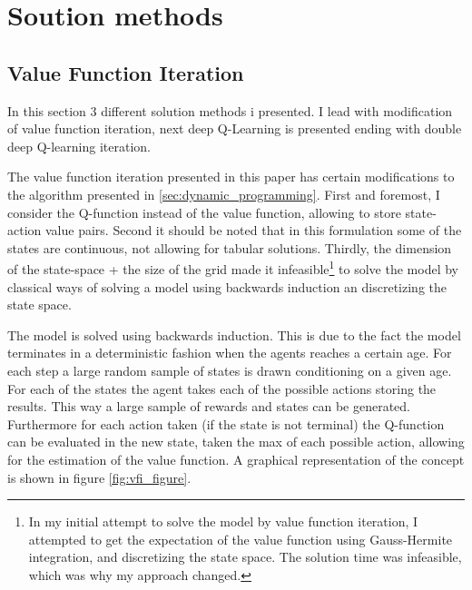 \section{Soution methods}\label{sec:solution_methods}

\subsection{Value Function Iteration}

In this section 3 different solution methods i presented. I lead with modification of value function iteration, next deep Q-Learning is presented ending with double deep Q-learning iteration.

The value function iteration presented in this paper has certain modifications to the algorithm presented in \ref{sec:dynamic_programming}. First and foremost, I consider the Q-function instead of the value function, allowing to store state-action value pairs. Second it should be noted that in this formulation some of the states are continuous, not allowing for tabular solutions. Thirdly, the dimension of the state-space + the size of the grid made it infeasible\footnote{In my initial attempt to solve the model by value function iteration, I attempted to get the expectation of the value function using Gauss-Hermite integration, and discretizing the state space. The solution time was infeasible, which was why my approach changed.} to solve the model by classical ways of solving a model using backwards induction an discretizing the state space. 

The model is solved using backwards induction. This is due to the fact the model terminates in a deterministic fashion when the agents reaches a certain age. For each step a large random sample of states is drawn conditioning on a given age. For each of the states the agent takes each of the possible actions storing the results. This way a large sample of rewards and states can be generated. Furthermore for each action taken (if the state is not terminal) the  Q-function can be evaluated in the new state, taken the max of each possible action, allowing for the estimation of the value function. A graphical representation of the concept is shown in figure \ref{fig:vfi_figure}. 

